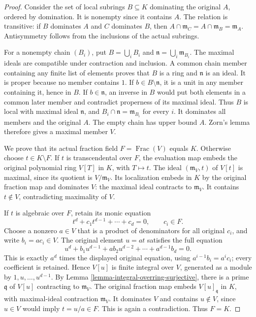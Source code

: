 \begin{proof}
Consider the set of local subrings
$B\subseteq K$ dominating the
original $A$, ordered by domination.
It is nonempty since it contains
$A$. The relation is transitive:
if $B$ dominates $A$ and $C$
dominates $B$, then
$A\cap\mathfrak m_C=A\cap\mathfrak m_B=\mathfrak m_A$.
Antisymmetry follows from the
inclusions of the actual subrings.

For a nonempty chain $(B_i)$,
put $B=\bigcup_i B_i$ and
$\mathfrak n=\bigcup_i\mathfrak m_{B_i}$.
The maximal ideals are compatible
under contraction and inclusion.
A common chain member containing
any finite list of elements proves
that $B$ is a ring and
$\mathfrak n$ is an ideal.
It is proper because no member
contains $1$. If $b\in B\setminus\mathfrak n$,
it is a unit in any member
containing it, hence in $B$.
If $b\in\mathfrak n$, an inverse
in $B$ would put both elements
in a common later member and
contradict properness of its
maximal ideal. Thus $B$ is
local with maximal ideal
$\mathfrak n$, and
$B_i\cap\mathfrak n=\mathfrak m_{B_i}$
for every $i$. It dominates
all members and the original
$A$. The empty chain has
upper bound $A$. Zorn's lemma
therefore gives a maximal
member $V$.

We prove that its actual
fraction field $F=\operatorname{Frac}(V)$
equals $K$. Otherwise choose
$t\in K\setminus F$.
If $t$ is transcendental over
$F$, the evaluation map embeds
the original polynomial ring
$V[T]$ in $K$, with $T\mapsto t$.
The ideal $(\mathfrak m_V,t)$
of $V[t]$ is maximal, since
its quotient is $V/\mathfrak m_V$.
Its localization embeds in
$K$ by the original fraction
map and dominates $V$:
the maximal ideal contracts
to $\mathfrak m_V$. It contains
$t\notin V$, contradicting
maximality of $V$.

If $t$ is algebraic over
$F$, retain its monic equation
$$
t^d+c_1t^{d-1}+\cdots+c_d=0,
\qquad c_i\in F.
$$
Choose a nonzero $a\in V$
that is a product of denominators
for all original $c_i$, and
write $b_i=ac_i\in V$.
The original element $u=at$
satisfies the full equation
$$
u^d+b_1u^{d-1}+a b_2u^{d-2}
+\cdots+a^{d-1}b_d=0.
$$
This is exactly $a^d$ times
the displayed original equation,
using $a^{i-1}b_i=a^ic_i$;
every coefficient is retained.
Hence $V[u]$ is finite integral
over $V$, generated as a module
by $1,u,\ldots,u^{d-1}$.
By Lemma
\ref{lemma-integral-overring-surjective},
there is a prime $\mathfrak q$
of $V[u]$ contracting to
$\mathfrak m_V$. The original
fraction map embeds $V[u]_{\mathfrak q}$
in $K$, with maximal-ideal
contraction $\mathfrak m_V$.
It dominates $V$ and contains
$u\notin V$, since $u\in V$
would imply $t=u/a\in F$.
This is again a contradiction.
Thus $F=K$.


\end{proof}

